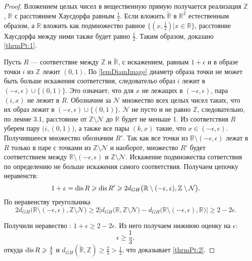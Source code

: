 \begin{proof}
Вложением целых чисел в вещественную прямую получается реализация $\mathbb{Z}$, $\mathbb{R}$ с расстоянием Хаусдорфа равным $\frac 1 2$.
Если вложить $\widetilde{\mathbb{R}}$ в $\mathbb{R}^{2}$ естественным образом, а $\mathbb{R}$ вложить как подмножество равное $\{(x, \frac1 2 )|x\in \mathbb{R}\}$,
расстояние Хаусдорфа между ними также будет равно $\frac 1 2$. Таким образом, доказано \ref{thrmPt:1}.

Пусть $R$ --- соответствие
между $\mathbb{Z}$ и $\widetilde{\mathbb{R}}$, с искажением,
равным $1 + \epsilon$ и
в образе точки $i$ из $\mathbb{Z}$ лежит $(0,1)$. По \ref{lemDiamImage} диаметр
образа точки не может быть больше искажения соответствия,
следовательо образ $i$ лежит в $(-\epsilon, \epsilon) \cup \bigl\{(0,1)\bigr\}$. Это
означает, что для
$x$ не лежащих в $(-\epsilon, \epsilon)$, пара $(i, x)$ не лежит в $R$.
Обозначим за $\mathcal{N}$ множество всех целых чисел таких, что их
образ лежит в $(-\epsilon, \epsilon) \cup \bigl\{(0,1)\bigr\}$.
$\mathcal{N}$ не пусто и не равно $\mathbb{Z}$, следовательно, по лемме 3.1,
расстояние от $\mathbb{Z} \setminus\mathcal{N}$ до $\mathbb{R}$ будет не
меньше 1.
Из соответствия $R$ уберем пару $\bigl(i,(0,1)\bigr)$, а также
все пары $(k,x)$ такие, что $x \in  (-\epsilon, \epsilon)$.
Получившееся множество обозначим $R'$.
Так как все точки из $\mathbb{R}\setminus(-\epsilon, \epsilon)$ лежат в $R$
только в паре с точками из $ \mathbb{Z} \setminus\mathcal{N}$ и наоборот,
множество $R'$ будет соответствием между
$\mathbb{R}\setminus(-\epsilon, \epsilon)$ и
$ \mathbb{Z} \setminus\mathcal{N}$. Искажение
подмножества сответствия по определению не больше искажения
самого соответствия. Получаем цепочку неравенств:
\[1+\upvarepsilon = \operatorname{dis} R \geqslant \operatorname{dis} R' \geqslant 2d_{GH}\bigl(\mathbb{R}\setminus(-\upvarepsilon, \upvarepsilon), \mathbb{Z} \setminus \mathcal{N}\bigr).\]
По неравенству треугольника
\[
    2d_{GH}\bigl(\mathbb{R}\setminus(-\epsilon, \epsilon), \mathbb{Z} \setminus \mathcal{N}\bigr) \ge
 2\Big|d_{GH}\bigl(\mathbb{R}, \mathbb{Z} \setminus \mathcal{N}\bigr) - d_{GH}\bigl(\mathbb{R}\setminus(-\epsilon, \epsilon), \mathbb{R}\bigr)\Big| \ge 2 - 2\epsilon.
\]

Получили неравество : $1 + \epsilon \ge 2 - 2\epsilon$.
Из него получаем нижнюю оценку на $\epsilon$:
\[\epsilon \ge \frac 1 3,\]
откуда $\operatorname{dis} R \geqslant \frac 4 3$ и
$d_{GH}\left(\widetilde{\mathbb{R}}, \mathbb{Z}\right) \ge \frac 2 3 > \frac 1 2$,
что доказывает \ref{thrmPt:2}.
\end{proof}
